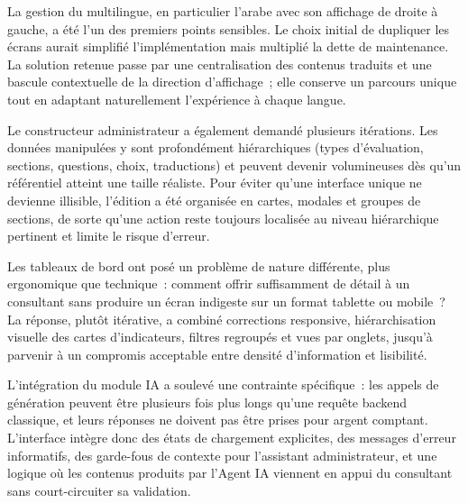 \documentclass[12pt,a4paper]{report}
\begin{document}
La gestion du multilingue, en particulier l'arabe avec son affichage de droite à gauche, a été l'un des premiers points sensibles. Le choix initial de dupliquer les écrans aurait simplifié l'implémentation mais multiplié la dette de maintenance. La solution retenue passe par une centralisation des contenus traduits et une bascule contextuelle de la direction d'affichage~; elle conserve un parcours unique tout en adaptant naturellement l'expérience à chaque langue.

Le constructeur administrateur a également demandé plusieurs itérations. Les données manipulées y sont profondément hiérarchiques (types d'évaluation, sections, questions, choix, traductions) et peuvent devenir volumineuses dès qu'un référentiel atteint une taille réaliste. Pour éviter qu'une interface unique ne devienne illisible, l'édition a été organisée en cartes, modales et groupes de sections, de sorte qu'une action reste toujours localisée au niveau hiérarchique pertinent et limite le risque d'erreur.

Les tableaux de bord ont posé un problème de nature différente, plus ergonomique que technique~: comment offrir suffisamment de détail à un consultant sans produire un écran indigeste sur un format tablette ou mobile~? La réponse, plutôt itérative, a combiné corrections responsive, hiérarchisation visuelle des cartes d'indicateurs, filtres regroupés et vues par onglets, jusqu'à parvenir à un compromis acceptable entre densité d'information et lisibilité.

L'intégration du module IA a soulevé une contrainte spécifique~: les appels de génération peuvent être plusieurs fois plus longs qu'une requête backend classique, et leurs réponses ne doivent pas être prises pour argent comptant. L'interface intègre donc des états de chargement explicites, des messages d'erreur informatifs, des garde-fous de contexte pour l'assistant administrateur, et une logique où les contenus produits par l'Agent IA viennent en appui du consultant sans court-circuiter sa validation.
\end{document}
